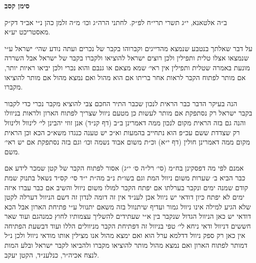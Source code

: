 \documentclass[12pt, openany]{book}
\newcommand{\chapname}{}
\newcommand{\newchap}[1]{
	\addcontentsline{toc}{chapter}{#1}
	\renewcommand{\chapname}{#1}
		\begin{center}
			\textbf{%
\fontsize{16pt}{16pt}\selectfont
				#1}
		\end{center}
}
\begin{document}
\newchap{סימן קסב}
\begin{multicols}{2}
ב״ה אלטאנא, י״ג תשרי תרי״ח לפ״ק. לחתני הרה״ג וכו׳ מ״ה זלמן כהן נ״י אב״ד דק״ק מאסטריכט יע״א.\\\vspace{0pt}

על דבר שאלתך בנטבע שנמצא מהדייגים וקברוהו בקבר של נכרים ועתה נודע שהי׳ ישראל ע״י שנמצאו אצלו טלית ותפילין ולכן רוצים ישראל להוציאו ולקברו בקבר של ישראל אבל השררה מונעת באמרה שטלית ותפילין אין ראי׳ שמא מצאם או גנבם והוא נכרי ולכן יביאו ראיות יותר, אם מותר לפתוח הקבר לראות אחר בריתו אם הוא מהול ואם נמצא מהול אם מותר להוציאו מקברו.\\\vspace{0pt}

הנה בעיקר הדבר כבר הראית לנכון שכבר התיר החכם צבי להוציא מקבר נכרי כדי לקבור בקבר ישראל רק נסתפקת אם מותר לעשות כן מטעם ניוול שצריך לפתוח הארון ולראות בניוולו והנה גם בזה הראית מקום לנכון ממה דאמרינן ב״ב (דף קנ״ד) אנן זוזי יהבינן לי׳ לינוול ולינוול רק שצדדת ששם עכ״פ הוא נתחייב בהמעות וא״כ יש טענה כנגדו משא״כ הכא וכן הראית מקום ממה דאמרינן חולין (דף י״א) וכ״ת משום אבוד נשמה וכו׳ וגם בזה נסתפקת אם יש ראי׳ משם.\\\vspace{0pt}

אמנם לפי מה דפסקינן בח״מ (סי׳ רל״ה ס׳ י״ג) אסור לפתוח הקבר של קטן שמכר לידע אם כבר הביא ב׳ שערות משום ניוול המת וגם בשו״ת נ״ב מה״ת י״ד סי׳ קס״ד נשאל בתנוק שמת קודם שמנה ימים ונקבר בערלתו אם יפתח הקבר למולו משום ניוול והשיב אם כבר עברו איזה ימים לא יפתח כיון דודאי יש ניוול אכן לענ״ד אין זה דומה לנדון זה דשם הניוול דערלה לקטן שלא הגיע למילה אינו ניוול גמור ועדיף שיתנוול בזה משאם יתנוול ע״י פתיחת הארון אבל הכא דודאי יש כאן הניוול הגדול שנקבר בין א״י שעתידים להשליך עצמותיו לחוץ כמנהגם ועוד שאר חששים דניוול ודאי ניחא לי׳ טפי בניוול זה דפתיחת הקבר מניוולים הללו ועוד דבשעת הפתיחה אין כאן רק ספק ניוול דדלמא ערל הוא ואם ימצא מהול אנו מצילין אותו מודאי ניוול ולכן נ״ל דמותר לפתוח הארון ואם נמצא מהול מותר להוציאו מקברו ולהביאו לקבר ישראל ובלע המות לנצח אכיה״ר, כנלענ״ד, הקטן יעקב.\\\vspace{0pt}

\end{multicols}\newpage
\end{document}
